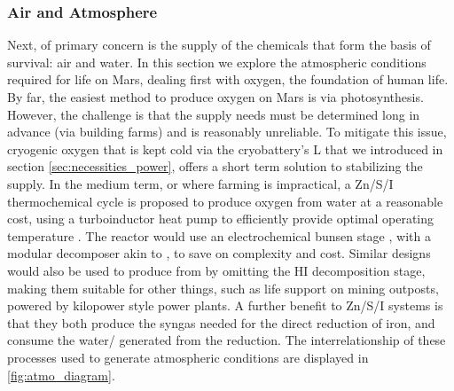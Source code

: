 \documentclass[fleqn,10pt]{Stylesheet} %
\begin{document}
\subsubsection{Air and Atmosphere}
\label{sec:necessities_air}

Next, of primary concern is the supply of the chemicals that form the basis of survival: air and water. In this section we explore the atmospheric conditions required for life on Mars, dealing first with oxygen, the foundation of human life. By far, the easiest method to produce oxygen on Mars is via photosynthesis. However, the challenge is that the supply needs must be determined long in advance (via building farms) and is reasonably unreliable. To mitigate this issue, cryogenic oxygen that is kept cold via the cryobattery’s L that we introduced in section \ref{sec:necessities_power}, offers a short term solution to stabilizing the supply. In the medium term, or where farming is impractical, a Zn/S/I thermochemical cycle \cite{YanweiZhang2013} is proposed to produce oxygen from water at a reasonable cost, using a turboinductor heat pump to efficiently provide optimal operating temperature \cite{JohnBucknellVideo, 2013Dujarric}. The reactor would use an electrochemical bunsen stage \cite{YanweiZhang2016}, with a modular decomposer akin to \cite{Moore&Parma}, to save on complexity and cost. Similar designs would also be used to produce  from  by omitting the HI decomposition stage, making them suitable for other things, such as life support on mining outposts, powered by kilopower style power plants. A further benefit to Zn/S/I systems is that they both produce the syngas needed for the direct reduction of iron, and consume the water/ generated from the reduction. The interrelationship of these processes used to generate atmospheric conditions are displayed in \ref{fig:atmo_diagram}. 
\end{document}
